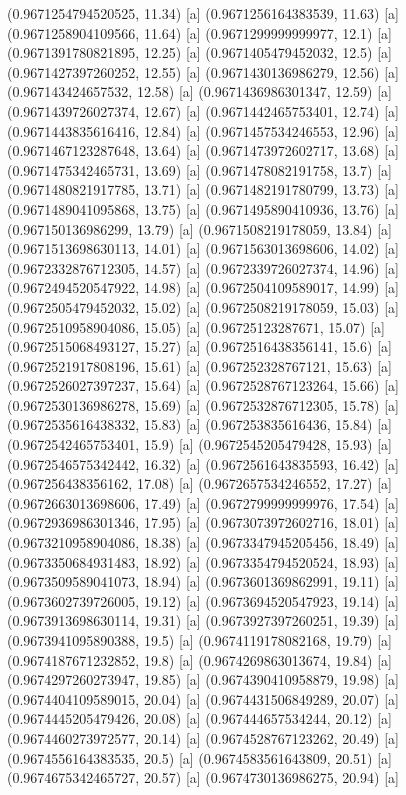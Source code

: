 {{{(0.9671254794520525, 11.34) [a] 
(0.9671256164383539, 11.63) [a] 
(0.9671258904109566, 11.64) [a] 
(0.9671299999999977, 12.1) [a] 
(0.9671391780821895, 12.25) [a] 
(0.9671405479452032, 12.5) [a] 
(0.9671427397260252, 12.55) [a] 
(0.9671430136986279, 12.56) [a] 
(0.967143424657532, 12.58) [a] 
(0.9671436986301347, 12.59) [a] 
(0.9671439726027374, 12.67) [a] 
(0.9671442465753401, 12.74) [a] 
(0.9671443835616416, 12.84) [a] 
(0.9671457534246553, 12.96) [a] 
(0.9671467123287648, 13.64) [a] 
(0.9671473972602717, 13.68) [a] 
(0.9671475342465731, 13.69) [a] 
(0.9671478082191758, 13.7) [a] 
(0.9671480821917785, 13.71) [a] 
(0.9671482191780799, 13.73) [a] 
(0.9671489041095868, 13.75) [a] 
(0.9671495890410936, 13.76) [a] 
(0.967150136986299, 13.79) [a] 
(0.9671508219178059, 13.84) [a] 
(0.9671513698630113, 14.01) [a] 
(0.9671563013698606, 14.02) [a] 
(0.9672332876712305, 14.57) [a] 
(0.9672339726027374, 14.96) [a] 
(0.9672494520547922, 14.98) [a] 
(0.9672504109589017, 14.99) [a] 
(0.9672505479452032, 15.02) [a] 
(0.9672508219178059, 15.03) [a] 
(0.9672510958904086, 15.05) [a] 
(0.96725123287671, 15.07) [a] 
(0.9672515068493127, 15.27) [a] 
(0.9672516438356141, 15.6) [a] 
(0.9672521917808196, 15.61) [a] 
(0.967252328767121, 15.63) [a] 
(0.9672526027397237, 15.64) [a] 
(0.9672528767123264, 15.66) [a] 
(0.9672530136986278, 15.69) [a] 
(0.9672532876712305, 15.78) [a] 
(0.9672535616438332, 15.83) [a] 
(0.967253835616436, 15.84) [a] 
(0.9672542465753401, 15.9) [a] 
(0.9672545205479428, 15.93) [a] 
(0.9672546575342442, 16.32) [a] 
(0.9672561643835593, 16.42) [a] 
(0.967256438356162, 17.08) [a] 
(0.9672657534246552, 17.27) [a] 
(0.9672663013698606, 17.49) [a] 
(0.9672799999999976, 17.54) [a] 
(0.9672936986301346, 17.95) [a] 
(0.9673073972602716, 18.01) [a] 
(0.9673210958904086, 18.38) [a] 
(0.9673347945205456, 18.49) [a] 
(0.9673350684931483, 18.92) [a] 
(0.9673354794520524, 18.93) [a] 
(0.9673509589041073, 18.94) [a] 
(0.9673601369862991, 19.11) [a] 
(0.9673602739726005, 19.12) [a] 
(0.9673694520547923, 19.14) [a] 
(0.9673913698630114, 19.31) [a] 
(0.9673927397260251, 19.39) [a] 
(0.9673941095890388, 19.5) [a] 
(0.9674119178082168, 19.79) [a] 
(0.9674187671232852, 19.8) [a] 
(0.9674269863013674, 19.84) [a] 
(0.9674297260273947, 19.85) [a] 
(0.9674390410958879, 19.98) [a] 
(0.9674404109589015, 20.04) [a] 
(0.9674431506849289, 20.07) [a] 
(0.9674445205479426, 20.08) [a] 
(0.967444657534244, 20.12) [a] 
(0.9674460273972577, 20.14) [a] 
(0.9674528767123262, 20.49) [a] 
(0.9674556164383535, 20.5) [a] 
(0.9674583561643809, 20.51) [a] 
(0.9674675342465727, 20.57) [a] 
(0.9674730136986275, 20.94) [a] 
}}}
